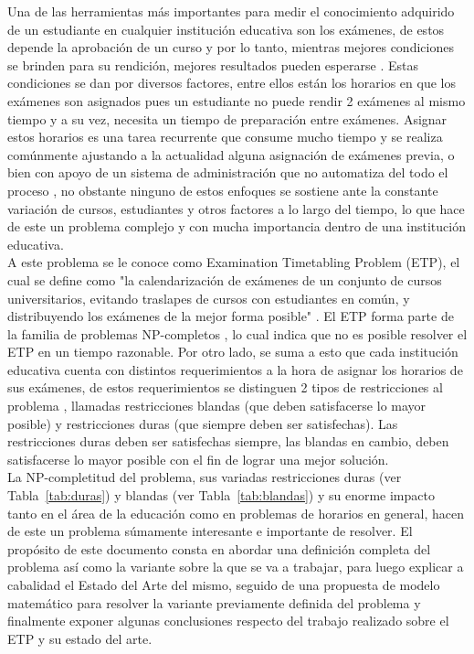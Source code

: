 \documentclass[letter, 10pt]{article}
\begin{document}
Una de las herramientas más importantes para medir el conocimiento adquirido de un estudiante en cualquier institución educativa son los exámenes, de estos depende la aprobación de un curso y por lo tanto, mientras mejores condiciones se brinden para su rendición, mejores resultados pueden esperarse \cite{MUKLASON2019647}. Estas condiciones se dan por diversos factores, entre ellos están los horarios en que los exámenes son asignados pues un estudiante no puede rendir 2 exámenes al mismo tiempo y a su vez, necesita un tiempo de preparación entre exámenes. Asignar estos horarios es una tarea recurrente que consume mucho tiempo y se realiza comúnmente ajustando a la actualidad alguna asignación de exámenes previa, o bien con apoyo de un sistema de administración que no automatiza del todo el proceso \cite{NAJIAZIMI2005705}, no obstante ninguno de estos enfoques se sostiene ante la constante variación de cursos, estudiantes y otros factores a lo largo del tiempo, lo que hace de este un problema complejo y con mucha importancia dentro de una institución educativa.\\

A este problema se le conoce como Examination Timetabling Problem (ETP), el cual se define como "la calendarización de exámenes de un conjunto de cursos universitarios, evitando traslapes de cursos con estudiantes en común, y distribuyendo los exámenes de la mejor forma posible" \cite{Schaerf1999}. El ETP forma parte de la familia de problemas NP-completos \cite{10.1093/comjnl/10.1.85}, lo cual indica que no es posible resolver el ETP en un tiempo razonable. Por otro lado, se suma a esto que cada institución educativa cuenta con distintos requerimientos a la hora de asignar los horarios de sus exámenes, de estos requerimientos se distinguen 2 tipos de restricciones al problema \cite{Qu2009}, llamadas restricciones blandas (que deben satisfacerse lo mayor posible) y restricciones duras (que siempre deben ser satisfechas). Las restricciones duras deben ser satisfechas siempre, las blandas en cambio, deben satisfacerse lo mayor posible con el fin de lograr una mejor solución.\\

La NP-completitud del problema, sus variadas restricciones duras (ver Tabla~\ref{tab:duras}) y blandas (ver Tabla~\ref{tab:blandas}) y su enorme impacto tanto en el área de la educación como en problemas de horarios en general, hacen de este un problema súmamente interesante e importante de resolver. El propósito de este documento consta en abordar una definición completa del problema así como la variante sobre la que se va a trabajar, para luego explicar a cabalidad el Estado del Arte del mismo, seguido de una propuesta de modelo matemático para resolver la variante previamente definida del problema y finalmente exponer algunas conclusiones respecto del trabajo realizado sobre el ETP y su estado del arte.
\end{document}
